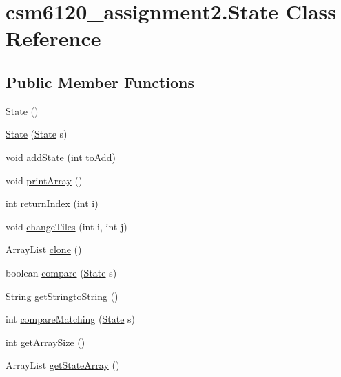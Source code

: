 \hypertarget{classcsm6120__assignment2_1_1_state}{\section{csm6120\+\_\+assignment2.\+State Class Reference}
\label{classcsm6120__assignment2_1_1_state}
}
\subsection*{Public Member Functions}
\begin{DoxyCompactItemize}
\item 
\hyperlink{classcsm6120__assignment2_1_1_state_a5f755141d91f3c2c1b6d7af214ac9730}{State} ()
\item 
\hyperlink{classcsm6120__assignment2_1_1_state_a43b473983c813473b8b255f16bf09feb}{State} (\hyperlink{classcsm6120__assignment2_1_1_state}{State} s)
\item 
void \hyperlink{classcsm6120__assignment2_1_1_state_a53db67883444a97d214913a1bb214d23}{add\+State} (int to\+Add)
\item 
void \hyperlink{classcsm6120__assignment2_1_1_state_a077d9b509f0f74ce818583095dad0574}{print\+Array} ()
\item 
int \hyperlink{classcsm6120__assignment2_1_1_state_a6ec3ecfdac717dd18ad4d150daae5ae3}{return\+Index} (int i)
\item 
void \hyperlink{classcsm6120__assignment2_1_1_state_a05c7bee2bf7cc98214085a6177f0660b}{change\+Tiles} (int i, int j)
\item 
Array\+List \hyperlink{classcsm6120__assignment2_1_1_state_a6fa41604fa28402d4f4229a322503454}{clone} ()
\item 
boolean \hyperlink{classcsm6120__assignment2_1_1_state_af110bd620c8f4f3814adf36ced545afa}{compare} (\hyperlink{classcsm6120__assignment2_1_1_state}{State} s)
\item 
String \hyperlink{classcsm6120__assignment2_1_1_state_a4e9f21e6abf5623fb8f9f76bca556e53}{get\+Stringto\+String} ()
\item 
int \hyperlink{classcsm6120__assignment2_1_1_state_aba1820883805199dc16c0ce2bf69c58c}{compare\+Matching} (\hyperlink{classcsm6120__assignment2_1_1_state}{State} s)
\item 
int \hyperlink{classcsm6120__assignment2_1_1_state_ad2bf84157626b3ded7d94f432b610f89}{get\+Array\+Size} ()
\item 
Array\+List \hyperlink{classcsm6120__assignment2_1_1_state_a8fb6d134952d230e7ca8459ae7894256}{get\+State\+Array} ()
\end{DoxyCompactItemize}


